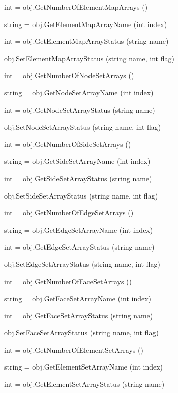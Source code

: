 \begin{DoxyItemize}
\item {\ttfamily int = obj.\-Get\-Number\-Of\-Element\-Map\-Arrays ()}  
\item {\ttfamily string = obj.\-Get\-Element\-Map\-Array\-Name (int index)}  
\item {\ttfamily int = obj.\-Get\-Element\-Map\-Array\-Status (string name)}  
\item {\ttfamily obj.\-Set\-Element\-Map\-Array\-Status (string name, int flag)}  
\item {\ttfamily int = obj.\-Get\-Number\-Of\-Node\-Set\-Arrays ()}  
\item {\ttfamily string = obj.\-Get\-Node\-Set\-Array\-Name (int index)}  
\item {\ttfamily int = obj.\-Get\-Node\-Set\-Array\-Status (string name)}  
\item {\ttfamily obj.\-Set\-Node\-Set\-Array\-Status (string name, int flag)}  
\item {\ttfamily int = obj.\-Get\-Number\-Of\-Side\-Set\-Arrays ()}  
\item {\ttfamily string = obj.\-Get\-Side\-Set\-Array\-Name (int index)}  
\item {\ttfamily int = obj.\-Get\-Side\-Set\-Array\-Status (string name)}  
\item {\ttfamily obj.\-Set\-Side\-Set\-Array\-Status (string name, int flag)}  
\item {\ttfamily int = obj.\-Get\-Number\-Of\-Edge\-Set\-Arrays ()}  
\item {\ttfamily string = obj.\-Get\-Edge\-Set\-Array\-Name (int index)}  
\item {\ttfamily int = obj.\-Get\-Edge\-Set\-Array\-Status (string name)}  
\item {\ttfamily obj.\-Set\-Edge\-Set\-Array\-Status (string name, int flag)}  
\item {\ttfamily int = obj.\-Get\-Number\-Of\-Face\-Set\-Arrays ()}  
\item {\ttfamily string = obj.\-Get\-Face\-Set\-Array\-Name (int index)}  
\item {\ttfamily int = obj.\-Get\-Face\-Set\-Array\-Status (string name)}  
\item {\ttfamily obj.\-Set\-Face\-Set\-Array\-Status (string name, int flag)}  
\item {\ttfamily int = obj.\-Get\-Number\-Of\-Element\-Set\-Arrays ()}  
\item {\ttfamily string = obj.\-Get\-Element\-Set\-Array\-Name (int index)}  
\item {\ttfamily int = obj.\-Get\-Element\-Set\-Array\-Status (string name)}  

\end{DoxyItemize}
